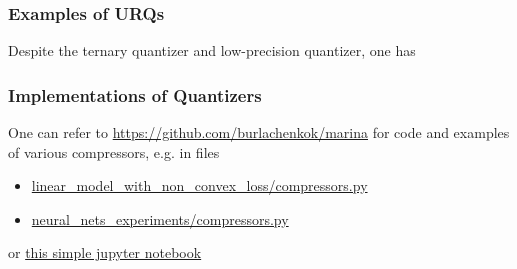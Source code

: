 
\begin{frame}
\frametitle{Examples of URQs}

Despite the ternary quantizer and low-precision quantizer, one has \cite{lizhize2020adiana}




\end{frame}


\begin{frame}
\frametitle{Implementations of Quantizers}

One can refer to \href{https://github.com/burlachenkok/marina}{https://github.com/burlachenkok/marina} for code and examples of various compressors, e.g. in files
\begin{itemize}
    \item \href{https://github.com/burlachenkok/marina/blob/main/linear_model_with_non_convex_loss/compressors.py}{linear\_model\_with\_non\_convex\_loss/compressors.py}
    \item \href{https://github.com/burlachenkok/marina/blob/main/neural_nets_experiments/compressors.py}{neural\_nets\_experiments/compressors.py}
\end{itemize}

\vspace{0.8em}

or \href{https://github.com/wenh06/fl_seminar/blob/master/code/compressors_test.ipynb}{this simple jupyter notebook}

\end{frame}

